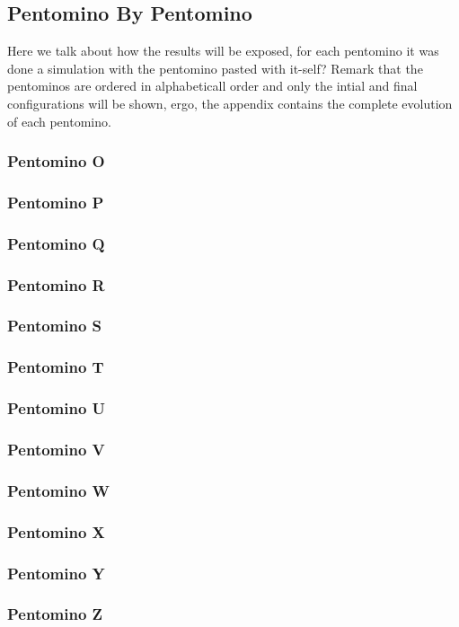 
\subsection{Pentomino By Pentomino}
Here we talk about how the results will be exposed, for each pentomino it
was done a simulation with the pentomino pasted with it-self?
Remark that the pentominos are ordered in alphabeticall order and only the
intial and final configurations will be shown, ergo, the appendix contains
the complete evolution of each pentomino.

\subsubsection{Pentomino O}
\subsubsection{Pentomino P}
\subsubsection{Pentomino Q}
\subsubsection{Pentomino R}
\subsubsection{Pentomino S}
\subsubsection{Pentomino T}
\subsubsection{Pentomino U}
\subsubsection{Pentomino V}
\subsubsection{Pentomino W}
\subsubsection{Pentomino X}
\subsubsection{Pentomino Y}
\subsubsection{Pentomino Z}
